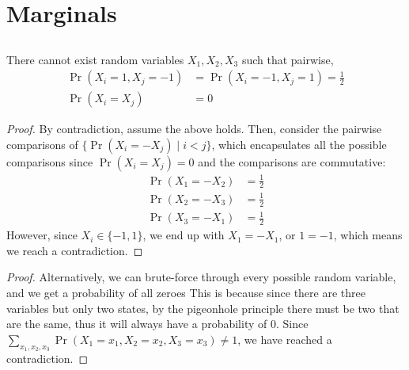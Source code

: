 \documentclass{article}
\begin{document}
\section{Marginals}

\subsection{}

\begin{theorem}
    There cannot exist random variables \(X_1, X_2, X_3\) such that pairwise,
    \begin{align}
        \Pr(X_i = 1, X_j = -1) &= \Pr(X_i = -1, X_j = 1) = \frac{1}{2} \\
        \Pr(X_i = X_j) &= 0
    \end{align}
\end{theorem}
\begin{proof}
    By contradiction, assume the above holds.
    Then, consider the pairwise comparisons of \(\{\Pr(X_i = -X_j) \mid i < j\}\), which encapsulates all the possible comparisons since \(\Pr(X_i = X_j) = 0\) and the comparisons are commutative:
    \begin{align}
        \Pr(X_1 = -X_2) &= \frac{1}{2} \\
        \Pr(X_2 = -X_3) &= \frac{1}{2} \\
        \Pr(X_3 = -X_1) &= \frac{1}{2}
    \end{align}
    However, since \(X_i \in \{-1, 1\}\), we end up with \(X_1 = -X_1\), or \(1 = -1\), which means we reach a contradiction.
\end{proof}
\begin{proof}
    Alternatively, we can brute-force through every possible random variable, and we get a probability of all zeroes
    This is because since there are three variables but only two states, by the pigeonhole principle there must be two that are the same, thus it will always have a probability of \(0\).
    Since \(\sum_{x_1, x_2, x_3} \Pr(X_1 = x_1, X_2 = x_2, X_3 = x_3) \neq 1\), we have reached a contradiction.
\end{proof}

\subsection{}
\end{document}
